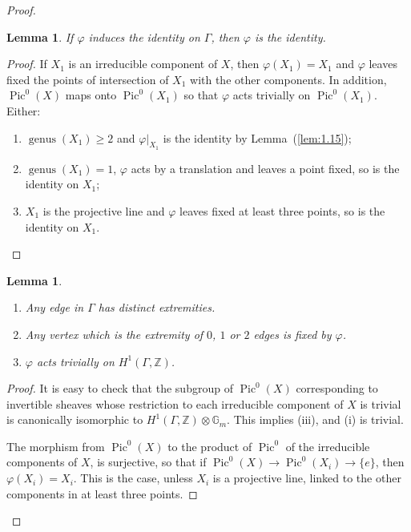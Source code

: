 \documentclass[10pt]{amsart}
\theoremstyle{plain}
\newtheorem{lemma}[theorem]{Lemma}
\theoremstyle{definition}
\DeclareMathOperator{\Pic}{Pic}
\DeclareMathOperator{\genus}{genus}
\begin{document}
\begin{proof}
\begin{lemma}\label{lem:1.16}
If $\varphi$ induces the identity on $\Gamma$, then $\varphi$ is the identity.
\end{lemma}

\begin{proof}
If $X_1$ is an irreducible component of $X$, then $\varphi(X_1) = X_1$ and $\varphi$ leaves fixed the points of intersection of $X_1$ with the other components. In addition, $\Pic^0(X)$ maps onto $\Pic^0(X_1)$ so that $\varphi$ acts trivially on $\Pic^0(X_1)$. Either:
\begin{enumerate}
\item[a)] $\genus(X_1) \geq 2$ and $\varphi|_{X_1}$ is the identity by Lemma~(\ref{lem:1.15});
\item[b)] $\genus(X_1) = 1$, $\varphi$ acts by a translation and leaves a point fixed, so is the identity on $X_1$;
\item[c)] $X_1$ is the projective line and $\varphi$ leaves fixed at least three points, so is the identity on $X_1$.
\end{enumerate}
\end{proof}

\begin{lemma}\label{lem:1.17}
\begin{enumerate}
\item[(i)] Any edge in $\Gamma$ has distinct extremities.
\item[(ii)] Any vertex which is the extremity of $0$, $1$ or $2$ edges is fixed by $\varphi$.
\item[(iii)] $\varphi$ acts trivially on $H^1(\Gamma, \mathbb{Z})$.
\end{enumerate}
\end{lemma}

\begin{proof}
It is easy to check that the subgroup of $\Pic^0(X)$ corresponding to invertible sheaves whose restriction to each irreducible component of $X$ is trivial is canonically isomorphic to $H^1(\Gamma, \mathbb{Z}) \otimes \mathbb{G}_m$. This implies (iii), and (i) is trivial.

The morphism from $\Pic^0(X)$ to the product of $\Pic^0$ of the irreducible components of $X$, is surjective, so that if $\Pic^0(X) \to \Pic^0(X_i) \to \{e\}$, then $\varphi(X_i) = X_i$. This is the case, unless $X_i$ is a projective line, linked to the other components in at least three points.
\end{proof}


\end{proof}
\end{document}
